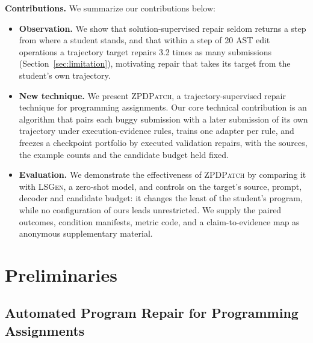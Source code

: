 \documentclass[10pt,conference]{IEEEtran}
\begin{document}
\noindent\textbf{Contributions.} We summarize our contributions below:
\begin{itemize}
\item \textbf{Observation.} We show that solution-supervised repair seldom returns a step from where a student stands, and that within a step of 20 AST edit operations a trajectory target repairs 3.2 times as many submissions (Section~\ref{sec:limitation}), motivating repair that takes its target from the student's own trajectory.
\item \textbf{New technique.} We present \textsc{ZPDPatch}, a trajectory-supervised repair technique for programming assignments. Our core technical contribution is an algorithm that pairs each buggy submission with a later submission of its own trajectory under execution-evidence rules, trains one adapter per rule, and freezes a checkpoint portfolio by executed validation repairs, with the sources, the example counts and the candidate budget held fixed.
\item \textbf{Evaluation.} We demonstrate the effectiveness of \textsc{ZPDPatch} by comparing it with \textsc{LSGen}, a zero-shot model, and controls on the target's source, prompt, decoder and candidate budget: it changes the least of the student's program, while no configuration of ours leads unrestricted. We supply the paired outcomes, condition manifests, metric code, and a claim-to-evidence map as anonymous supplementary material.
\end{itemize}

\section{Preliminaries}
\label{sec:preliminaries}
\subsection{Automated Program Repair for Programming Assignments}
\label{sec:formulation}
\end{document}
